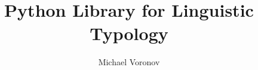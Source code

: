 \documentclass{beamer}
\begin{document}
\title{Python Library for Linguistic Typology}  
\author{Michael Voronov}
\end{document}
